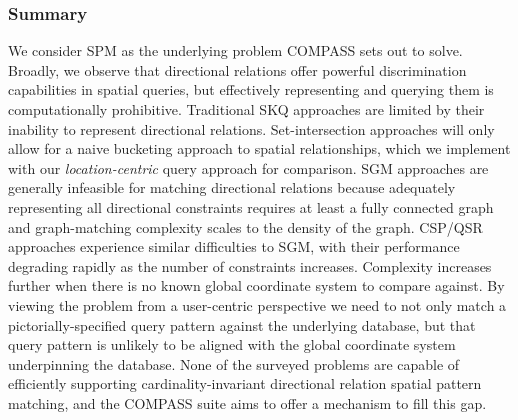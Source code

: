\subsubsection{Summary}
\par{
    We consider SPM as the underlying problem COMPASS sets out to solve. 
    Broadly, we observe that directional relations offer powerful discrimination capabilities in spatial queries, but effectively representing and querying them is computationally prohibitive. 
    Traditional SKQ approaches are limited by their inability to represent directional relations. 
    Set-intersection approaches will only allow for a naive bucketing approach to spatial relationships, which we implement with our \textit{location-centric} query approach for comparison.
    SGM approaches are generally infeasible for matching directional relations because adequately representing all directional constraints requires at least a fully connected graph and graph-matching complexity scales to the density of the graph.
    CSP/QSR approaches experience similar difficulties to SGM, with their performance degrading rapidly as the number of constraints increases.
    Complexity increases further when there is no known global coordinate system to compare against. 
    By viewing the problem from a user-centric perspective we need to not only match a pictorially-specified query pattern against the underlying database, but that query pattern is unlikely to be aligned with the global coordinate system underpinning the database. 
    None of the surveyed problems are capable of efficiently supporting cardinality-invariant directional relation spatial pattern matching, and the COMPASS suite aims to offer a mechanism to fill this gap. 
}

